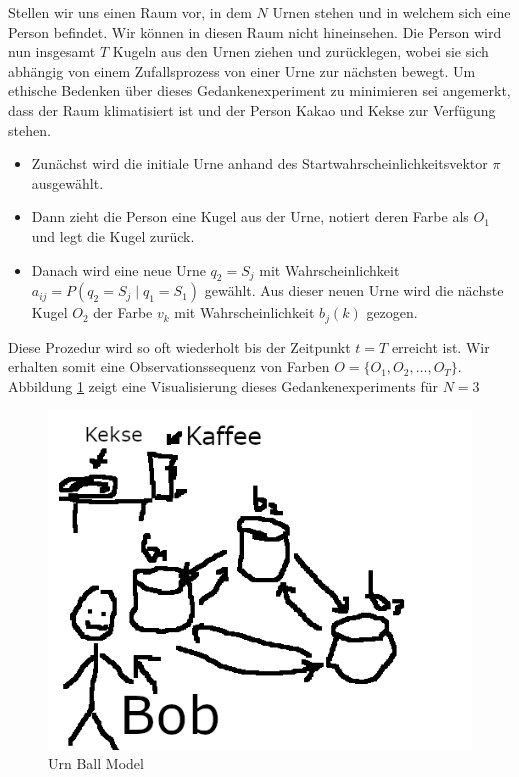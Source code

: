 Stellen wir uns einen Raum vor, in dem $N$ Urnen stehen und in welchem sich eine Person befindet. Wir können in diesen Raum nicht hineinsehen. Die Person wird nun insgesamt $T$ Kugeln aus den Urnen ziehen und zurücklegen, wobei sie sich abhängig von einem Zufallsprozess von einer Urne zur nächsten bewegt. Um ethische Bedenken über dieses Gedankenexperiment zu minimieren sei angemerkt, dass der Raum klimatisiert ist und der Person Kakao und Kekse zur Verfügung stehen.
\begin{itemize}
    \item Zunächst wird die initiale Urne anhand des Startwahrscheinlichkeitsvektor $\pi$ ausgewählt.
    \item Dann zieht die Person eine Kugel aus der Urne, notiert deren Farbe als $O_1$ und legt die Kugel zurück.
    \item Danach wird eine neue Urne $q_2 = S_j$ mit Wahrscheinlichkeit $a_{ij} = P(q_2 = S_j \mid q_1 = S_1)$ gewählt. Aus dieser neuen Urne wird die nächste Kugel $O_2$ der Farbe $v_k$ mit Wahrscheinlichkeit $b_j(k)$ gezogen.
\end{itemize}
Diese Prozedur wird so oft wiederholt bis der Zeitpunkt $t=T$ erreicht ist. Wir erhalten somit eine Observationssequenz von Farben $O= \{O_1, O_2, \dots, O_T \}$.
Abbildung \ref{fig:urn_ball_model} zeigt eine Visualisierung dieses Gedankenexperiments für $N=3$

\begin{figure}[h!]
    \includegraphics[scale=1.0]{images/Ball_Urn_Model.png}
    \caption{Urn Ball Model}
    \label{fig:urn_ball_model}
\end{figure}